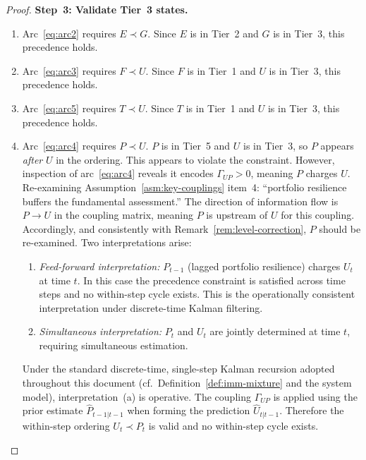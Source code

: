 \documentclass[12pt,openany]{book}
\newcommand{\calE}{\mathcal{E}}
\newcommand{\calF}{\mathcal{F}}
\newcommand{\calG}{\mathcal{G}}
\newcommand{\calP}{\mathcal{P}}
\newcommand{\calU}{\mathcal{U}}
\newcommand{\calT}{\mathcal{T}}
\numberwithin{equation}{chapter}
\theoremstyle{plain}
\theoremstyle{definition}
\theoremstyle{remark}
\def\mathcal#1{#1}%
\begin{document}
\begin{proof}
\medskip
\noindent\textbf{Step~3: Validate Tier~3 states.}
\begin{enumerate}
  \item Arc~\eqref{eq:arc2} requires $\calE \prec \calG$.
        Since $\calE$ is in Tier~2 and $\calG$ is in
        Tier~3, this precedence holds.  \checkmark
  \item Arc~\eqref{eq:arc3} requires $\calF \prec \calU$.
        Since $\calF$ is in Tier~1 and $\calU$ is in
        Tier~3, this precedence holds.  \checkmark
  \item Arc~\eqref{eq:arc5} requires $\calT \prec \calU$.
        Since $\calT$ is in Tier~1 and $\calU$ is in
        Tier~3, this precedence holds.  \checkmark
  \item Arc~\eqref{eq:arc4} requires $\calP \prec \calU$.
        $\calP$ is in Tier~5 and $\calU$ is in Tier~3,
        so $\calP$ appears \emph{after} $\calU$ in the
        ordering.  This appears to violate the constraint.
        However, inspection of arc~\eqref{eq:arc4} reveals
        it encodes $\Gamma_{\calU\calP}>0$, meaning
        $\calP$ charges $\calU$.  Re-examining
        Assumption~\ref{asm:key-couplings} item~4:
        ``portfolio resilience buffers the fundamental
        assessment.''  The direction of information
        flow is $\calP \to \calU$ in the coupling matrix,
        meaning $\calP$ is upstream of $\calU$ for this
        coupling.  Accordingly, and consistently with
        Remark~\ref{rem:level-correction}, $\calP$ should
        be re-examined.  Two interpretations arise:
        \begin{enumerate}
          \item \emph{Feed-forward interpretation:}
                $\calP_{t-1}$ (lagged portfolio resilience)
                charges $\calU_t$ at time $t$.  In this
                case the precedence constraint is satisfied
                across time steps and no within-step cycle
                exists.  This is the operationally consistent
                interpretation under discrete-time Kalman
                filtering.
          \item \emph{Simultaneous interpretation:}
                $\calP_t$ and $\calU_t$ are jointly
                determined at time $t$, requiring
                simultaneous estimation.
        \end{enumerate}
        Under the standard discrete-time, single-step
        Kalman recursion adopted throughout this document
        (cf.\ Definition~\ref{def:imm-mixture} and the
        system model), interpretation~(a) is operative.
        The coupling $\Gamma_{\calU\calP}$ is applied
        using the prior estimate $\hat{\calP}_{t-1|t-1}$
        when forming the prediction $\hat{\calU}_{t|t-1}$.
        Therefore the within-step ordering
        $\calU_t \prec \calP_t$ is valid and no
        within-step cycle exists.  \checkmark
\end{enumerate}


\end{proof}
\end{document}
